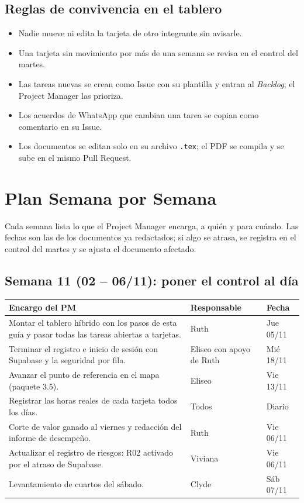 \documentclass[11pt,a4paper]{article}
\begin{document}
\subsection{Reglas de convivencia en el tablero}
\begin{itemize}[leftmargin=*]
    \item Nadie mueve ni edita la tarjeta de otro integrante sin avisarle.
    \item Una tarjeta sin movimiento por más de una semana se revisa en el control del martes.
    \item Las tareas nuevas se crean como Issue con su plantilla y entran al \textit{Backlog}; el Project Manager las prioriza.
    \item Los acuerdos de WhatsApp que cambian una tarea se copian como comentario en su Issue.
    \item Los documentos se editan solo en su archivo \texttt{.tex}; el PDF se compila y se sube en el mismo Pull Request.
\end{itemize}

\section{Plan Semana por Semana}
Cada semana lista lo que el Project Manager encarga, a quién y para cuándo. Las fechas son las de los documentos ya redactados; si algo se atrasa, se registra en el control del martes y se ajusta el documento afectado.

\subsection{Semana 11 (02 -- 06/11): poner el control al día}
{\small
{}
\noindent\begin{tabularx}{\textwidth}{@{}L P{2.7cm} C{1.6cm}@{}}
\toprule
{}
\textbf{Encargo del PM} & \textbf{Responsable} & \textbf{Fecha} \\
\midrule
Montar el tablero híbrido con los pasos de esta guía y pasar todas las tareas abiertas a tarjetas. & Ruth & Jue 05/11 \\
Terminar el registro e inicio de sesión con Supabase y la seguridad por fila. & Eliseo con apoyo de Ruth & Mié 18/11 \\
Avanzar el punto de referencia en el mapa (paquete 3.5). & Eliseo & Vie 13/11 \\
Registrar las horas reales de cada tarjeta todos los días. & Todos & Diario \\
Corte de valor ganado al viernes y redacción del informe de desempeño. & Ruth & Vie 06/11 \\
Actualizar el registro de riesgos: R02 activado por el atraso de Supabase. & Viviana & Vie 06/11 \\
Levantamiento de cuartos del sábado. & Clyde & Sáb 07/11 \\
\bottomrule
\end{tabularx}
}
\end{document}
